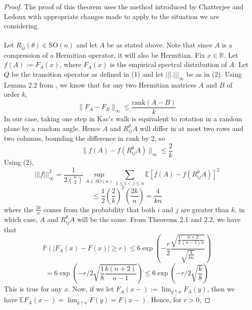 \documentclass[12pt]{report}
\newcommand{\tripNorm}[1]{|||#1|||_\infty}
\theoremstyle{definition}
\begin{document}
\begin{proof}
The proof of this theorem uses the method introduced by Chatterjee and Ledoux \cite {ChatLed} with appropriate changes made to apply to the situation we are considering.  \\ \\ 
Let $R_{ij}(\theta)\in\mathrm{SO}(n)$ and let $A$ be as stated above.  Note that since $A$ is a compression of a Hermitian operator, it will also be Hermitian.  Fix $x\in\mathbb{R}$.  Let $f(A):=F_A(x)$, where $F_A(x)$ is the empirical spectral distribution of $A$.  Let $Q$ be the transition operator as defined in (1) and let $\tripNorm{.}$ be as in (2).  Using Lemma 2.2 from \cite{Bai}, we know that for any two Hermitian matrices $A$ and $B$ of order $k$, 
\begin{equation*} \|F_A-F_B\|_{\infty}\leq\frac{\mathrm{rank}(A-B)}{k}
\end{equation*}
In our case, taking one step in Kac's walk is equivalent to rotation in a random plane by a random angle.  Hence $A$ and $R_{ij}^{\theta}A$ will differ in at most two rows and two columns, bounding the difference in rank by $2$, so
\begin{equation*}
\|f(A)-f(R_{ij}^{\theta}A)\|_{\infty}\leq\frac{2}{k}
\end{equation*}
Using (2), 
\begin{equation*}
\tripNorm{f}^2 = \frac 1 {2\binom{n}{2}} \sup_{A\in SO(n)}\sum_{1\leq i<j\leq n} \mathbb{E}[f(A)-f(R_{ij}^{\theta}A)]^2
\end{equation*}
\begin{equation*}
\leq \frac 1 {2} \left(\frac{2}{k}\right)^2\left(\frac{2k}{n}\right)=\frac{4}{kn}
\end{equation*} where the $\frac{2k}{n}$ comes from the probability that both $i$ and $j$ are greater than $k$, in which case, $A$ and $R^{\theta}_{ij}A$ will be the same.
From Theorems 2.1 and 2.2, we have that 
\begin{equation*}
\mathbb{P}(|F_A(x)-F(x)|\geq r)\leq 6\exp\left(-\frac{r}{2}\frac{\sqrt{\frac{1}{2}\frac{n+2}{(n-1)n}}}{\sqrt{\frac{4}{kn}}}\right)
\end{equation*}
\begin{equation*}
=6\exp\left(-r/2\sqrt{\frac{1}{8}\frac{k(n+2)}{n-1}}\right)\leq 6\exp\left(-r/2\sqrt{\frac{k}{8}}\right)
\end{equation*}
This is true for any $x$.  Now, if we let $F_A(x-):=\lim_{y\uparrow x}F_A(y)$, then we have $\mathbb{E}F_A(x-)=\lim_{y\uparrow x}F(y)=F(x-)$.  Hence, for $r>0$, 

\end{proof}
\end{document}
